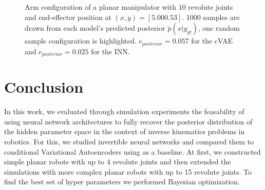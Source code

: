 \documentclass[conference]{IEEEtran}
\begin{document}
\begin{figure}[tbh]
\centering

    \caption{\label{fig:posterior:10dof} Arm configuration of a planar manipulator with $10$ revolute joints and end-effector position at $(x, y) = [5.00 0.53]$. 1000 samples are drawn from each model's predicted posterior $\tilde{p}(x | y_{gt})$, one random sample configuration is highlighted. $e_{posterior} = 0.057$ for the cVAE and $e_{posterior} = 0.025$ for the INN.}
\end{figure}

\section*{Conclusion}

In this work, we evaluated through simulation experiments the feasability of using neural network architectures to fully recover the posterior distribution of the hidden parameter space in the context of inverse kinematics problems in robotics. For this, we studied invertible neural networks and compared them to conditional Variational Autoencoders using as a baseline. At first, we constructed simple planar robots with up to 4 revolute joints and then extended the simulations with more complex planar robots with up to 15 revolute joints. To find the best set of hyper parameters we performed Bayesian optimization.
\end{document}
